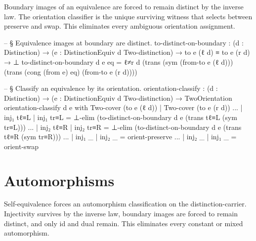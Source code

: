 \documentclass[11pt,a4paper]{book}
\def\texttt#1{#1}%
\begin{document}
Boundary images of an equivalence are forced to remain distinct by the inverse law.
The orientation classifier is the unique surviving witness that selects between preserve and swap.
This eliminates every ambiguous orientation assignment.

\begin{code}
-- § Equivalence images at boundary are distinct.
to-distinct-on-boundary :
  (d : Distinction) →
  (e : DistinctionEquiv d Two-distinction) →
  to e (ℓ d) ≡ to e (r d) → ⊥
to-distinct-on-boundary d e eq =
  ℓ≠r d (trans (sym (from-to e (ℓ d))) (trans (cong (from e) eq) (from-to e (r d))))

-- § Classify an equivalence by its orientation.
orientation-classify :
  (d : Distinction) →
  (e : DistinctionEquiv d Two-distinction) →
  TwoOrientation
orientation-classify d e with Two-cover (to e (ℓ d)) | Two-cover (to e (r d))
... | inj₁ tℓ≡L | inj₁ tr≡L = ⊥-elim (to-distinct-on-boundary d e (trans tℓ≡L (sym tr≡L)))
... | inj₂ tℓ≡R | inj₂ tr≡R = ⊥-elim (to-distinct-on-boundary d e (trans tℓ≡R (sym tr≡R)))
... | inj₁ _ | inj₂ _ = orient-preserve
... | inj₂ _ | inj₁ _ = orient-swap
\end{code}

\section{Automorphisms}

Self-equivalence forces an automorphism classification on the distinction-carrier.
Injectivity survives by the inverse law, boundary images are forced to remain distinct, and only \texttt{id} and \texttt{dual} remain.
This eliminates every constant or mixed automorphism.
\end{document}
